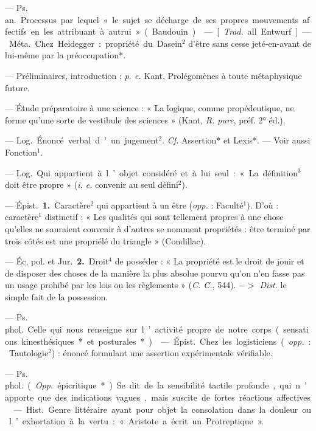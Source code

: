 \begin{itemize}[leftmargin=1cm, label=, itemsep=1pt]
 — \si{Ps. an.} Processus par
lequel « le sujet se décharge de ses
propres mouvements affectifs en les
attribuant à autrui » (Baudouin).

 — [{\it Trad.} all. Entwurf] — \si{Méta.}
Chez Heidegger : propriété du Dasein$^2$ d’être sans cesse jeté-en-avant
de lui-même par la préoccupation*.

 — Préliminaires, introduction : {\it p. e.} Kant, Prolégomènes
à toute métaphysique future.

 — Étude préparatoire
à une science : « La logique, comme
propédeutique, ne forme qu'une
sorte de vestibule des sciences »
(Kant, {\it R. pure}, préf. 2° éd.).

 — \si{Log.} Énoncé verbal
d’un jugement$^2$. {\it Cf.} Assertion* et
Lexis*. — Voir aussi Fonction$^1$.

 — \si{Log.} Qui appartient à
l’objet considéré et à lui seul : « La
définition$^3$ doit être propre » ({\it i. e.}
convenir au seul défini$^2$).

 — \si{Épist.} {\bf 1.} Caractère$^2$ qui
appartient à un être ({\it opp.} : Faculté$^1$).
D'où : caractère$^1$ distinctif : « Les
qualités qui sont tellement propres
à une chose qu'elles ne sauraient
convenir à d’autres se nomment
propriétés : être terminé par trois
côtés est une propriélé du triangle »
(Condillac).

— Éc, pol. et \si{Jur.} {\bf 2.} Droit$^4$ de
posséder : « La propriété est le droit
de jouir et de disposer des choses
de la manière la plus absolue pourvu
qu’on n’en fasse pas un usage prohibé
par les lois ou les règlements » ({\it C. C.},
544). $->$ {\it Dist.} le simple fait de la
possession.

 — \si{Ps. phol.}
Celle qui nous renseigne sur l’activité propre de notre corps (sensations kinesthésiques* et posturales*).

 — \si{Épist.} Chez les logisticiens
({\it opp.} : Tautologie$^2$) : énoncé formulant une assertion expérimentale
vérifiable.

 — \si{Ps. phol.} ({\it Opp.}
épicritique*). Se dit de la sensibilité
tactile profonde, qui n’apporte que
des indications vagues, mais suscite
de fortes réactions affectives.

 — \si{Hist.} Genre littéraire
ayant pour objet la consolation
dans la douleur ou l’exhortation
à la vertu : « Aristote a écrit un
Protreptique ».


\end{itemize}
